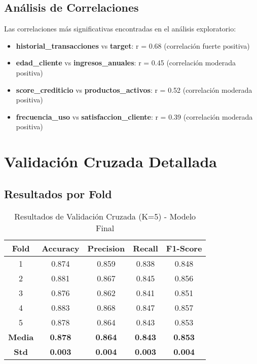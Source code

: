 \subsection{Análisis de Correlaciones}
\label{subsec:correlaciones}

Las correlaciones más significativas encontradas en el análisis exploratorio:

\begin{itemize}
    \item \textbf{historial\_transacciones} vs \textbf{target}: r = 0.68 (correlación fuerte positiva)
    \item \textbf{edad\_cliente} vs \textbf{ingresos\_anuales}: r = 0.45 (correlación moderada positiva)
    \item \textbf{score\_crediticio} vs \textbf{productos\_activos}: r = 0.52 (correlación moderada positiva)
    \item \textbf{frecuencia\_uso} vs \textbf{satisfaccion\_cliente}: r = 0.39 (correlación moderada positiva)
\end{itemize}


\section{Validación Cruzada Detallada}
\label{sec:validacion_cruzada}

\subsection{Resultados por Fold}
\label{subsec:resultados_fold}

\begin{table}[htbp]
    \centering
    \caption{Resultados de Validación Cruzada (K=5) - Modelo Final}
    \label{tab:cv_results}
    \begin{tabular}{|c|c|c|c|c|}
        \hline
        \textbf{Fold} & \textbf{Accuracy} & \textbf{Precision} & \textbf{Recall} & \textbf{F1-Score} \\
        \hline
        1 & 0.874 & 0.859 & 0.838 & 0.848 \\
        \hline
        2 & 0.881 & 0.867 & 0.845 & 0.856 \\
        \hline
        3 & 0.876 & 0.862 & 0.841 & 0.851 \\
        \hline
        4 & 0.883 & 0.868 & 0.847 & 0.857 \\
        \hline
        5 & 0.878 & 0.864 & 0.843 & 0.853 \\
        \hline
        \textbf{Media} & \textbf{0.878} & \textbf{0.864} & \textbf{0.843} & \textbf{0.853} \\
        \hline
        \textbf{Std} & \textbf{0.003} & \textbf{0.004} & \textbf{0.003} & \textbf{0.004} \\
        \hline
    \end{tabular}
\end{table}

